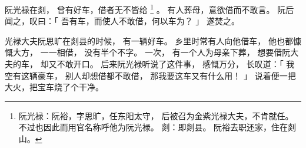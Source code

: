 
\pagebreak
\switchcolumn*[\section{}]

阮光禄在剡，
曾有好车，借者无不皆给%
\footnote{%
    阮光禄：阮裕，字思旷，任东阳太守，
            后被召为金紫光禄大夫，不肯就任。
            不过也因此而用官名称呼他为阮光禄。
    剡：即剡县。
        阮裕去职还家，住在剡山。
}%
。
有人葬母，意欲借而不敢言。
阮后闻之，叹曰：「
    吾有车，而使人不敢借，何以车为？
」
遂焚之。

\switchcolumn

光䘵大夫阮思旷在剡县的时候，
有一辆好车。
乡里时常有人向他借车，
他也都慷慨大方，
一一相借，
没有半个不字。
一次，
有一个人为母亲下葬，
想要借阮大夫的车，
却又不敢开口。
后来阮光禄听说了这件事，
感慨万分，
长叹道：「
    我空有这辆豪车，
    别人却想借都不敢借，
    那我要这车又有什么用！
」
说着便一把大火，把宝车烧了个干净。

